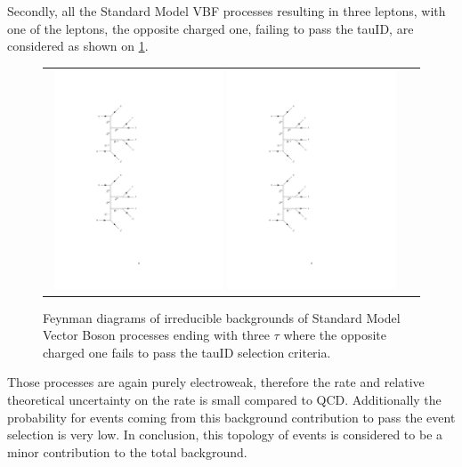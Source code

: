 Secondly, all the Standard Model VBF processes resulting in three leptons, with one of the leptons, the opposite charged one, failing to pass the tauID, are considered as shown on \ref{fig:background_SMVBFZ0Wmiss}.

\begin{figure}[tbh!]
	\centering
	\begin{tabular}{cc}
		\includegraphics[width=0.48\textwidth]{diagrams/pics/background_SMVBFZ0Wmissminus.pdf}
		\includegraphics[width=0.48\textwidth]{diagrams/pics/background_SMVBFZ0Wmissplus.pdf} 		
	\end{tabular}
	\caption{Feynman diagrams of irreducible backgrounds of Standard Model Vector Boson  processes ending with three $\tau$ where the opposite charged one fails to pass the tauID selection criteria. }
	\label{fig:background_SMVBFZ0Wmiss}
\end{figure}

Those processes are again purely electroweak, therefore the rate and relative theoretical uncertainty on the rate is small compared to QCD. Additionally the probability for events coming from this background contribution to pass the event selection is very low. In conclusion, this topology of events is considered to be a minor contribution to the total background.  

